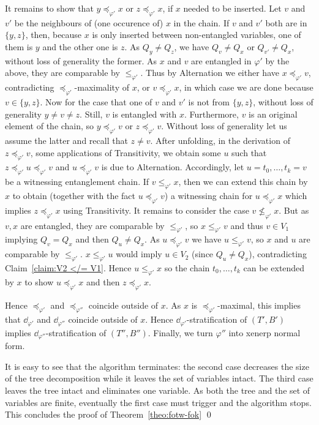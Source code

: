 \documentclass{LMCS}
\renewcommand{\phi}{\varphi}
\newcommand{\trans}{Transitivity}
\newcommand{\alt}{Alternation}
\begin{document}
It remains to show that $y\preceq_{\phi'}x$ or $z\preceq_{\phi'}x$, 
if $x$ needed to be inserted. 
Let $v$ and $v'$ be the neighbours of (one occurence of) $x$ in the chain. 
If $v$ and $v'$ both are in $\{y,z\}$, 
then, because $x$ is only inserted between non-entangled variables, 
one of them is $y$ and the other one is $z$. 
As $Q_y\not=Q_z$, we have $Q_v\not=Q_x$ or $Q_{v'}\not=Q_x$, 
without loss of generality the former. 
As $x$ and $v$ are entangled in $\phi'$ by the above, 
they are comparable by $\leq_{\phi'}$. 
Thus by \alt{} we either have $x\preceq_{\phi'}v$, 
contradicting $\preceq_{\phi'}$-maximality of $x$, 
or $v\preceq_{\phi'}x$, in which case we are done because $v\in\{y,z\}$. 
Now for the case that one of $v$ and $v'$ is not from $\{y,z\}$, 
without loss of generality $y\not=v\not=z$. 
Still, $v$ is entangled with $x$. 
Furthermore, $v$ is an original element of the chain, 
so $y\preceq_{\phi'}v$ or $z\preceq_{\phi'}v$. 
Without loss of generality let us assume the latter 
and recall that $z\not=v$. 
After unfolding, in the derivation of $z\preceq_{\phi'}v$, 
some applications of \trans, 
we obtain some $u$ such that $z\preceq_{\phi'}u\preceq_{\phi'}v$ 
and $u\preceq_{\phi'}v$ is due to \alt. 
Accordingly, let $u=t_0,\ldots,t_k=v$ be a witnessing entanglement chain. 
If $v\leq_{\phi'}x$, then we can extend this chain by $x$ 
to obtain (together with the fact $u\preceq_{\phi'}v$) 
a witnessing chain for $u\preceq_{\phi'}x$ 
which implies $z\preceq_{\phi'}x$ using \trans. 
It remains to consider the case $v\not\leq_{\phi'}x$. 
But as $v,x$ are entangled, they are comparable by $\leq_{\phi'}$, 
so $x\leq_{\phi'}v$ and thus $v\in V_1$ 
implying $Q_v=Q_x$ and then $Q_u\not=Q_x$. 
As $u\preceq_{\phi'}v$ we have $u\leq_{\phi'}v$, 
so $x$ and $u$ are comparable by $\leq_{\phi'}$. 
$x\leq_{\phi'}u$ would imply $u\in V_2$ (since $Q_u\not=Q_x$), 
contradicting Claim~\ref{claim:V2 </= V1}. 
Hence $u\leq_{\phi'}x$ so the chain $t_0,\ldots,t_k$ 
can be extended by $x$ to show $u\preceq_{\phi'}x$ 
and then $z\preceq_{\phi'}x$. 
\cqed

Hence $\preceq_{\phi'}$ and $\preceq_{\phi''}$ coincide outside of $x$. 
As $x$ is $\preceq_{\phi'}$-maximal, 
this implies that $\dd_{\phi'}$ and $\dd_{\phi''}$ coincide outside of $x$. 
Hence $\dd_{\phi'}$-stratification of $(T',B')$ 
implies $\dd_{\phi''}$-stratification of $(T'',B'')$. 
Finally, we turn $\phi''$ into xenerp normal form. 

It is easy to see that the algorithm terminates: 
the second case decreases the size of the tree decomposition 
while it leaves the set of variables intact. 
The third case leaves the tree intact and eliminates one variable. 
As both the tree and the set of variables are finite, 
eventually the first case must trigger and the algorithm stops. 
This concludes the proof of Theorem~\ref{theo:fotw-fok}
\qed
\end{document}
